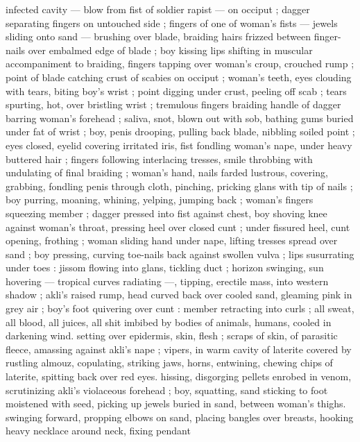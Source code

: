 {infected cavity --- blow from fist of soldier rapist --- on occiput ; 
dagger separating fingers on untouched side ; fingers of one of 
woman's fists --- jewels sliding onto sand --- brushing over blade, 
braiding hairs frizzed between finger-nails over embalmed edge of 
blade ; boy kissing lips shifting in muscular accompaniment to 
braiding, fingers tapping over woman's croup, crouched rump ; point 
of blade catching crust of scabies on occiput ; woman's teeth, eyes 
clouding with tears, biting boy's wrist ; point digging under crust, 
peeling off scab ; tears spurting, hot, over bristling wrist ; tremulous 
fingers braiding handle of dagger barring woman's forehead ; saliva, 
snot, blown out with sob, bathing gums buried under fat of wrist ; 
boy, penis drooping, pulling back blade, nibbling soiled point ; eyes 
closed, eyelid covering irritated iris, fist fondling woman's nape, 
under heavy buttered hair ; fingers following interlacing tresses, 
smile throbbing with undulating of final braiding ; woman's hand, 
nails farded lustrous, covering, grabbing, fondling penis through 
cloth, pinching, pricking glans with tip of nails ; boy purring, 
moaning, whining, yelping, jumping back ; woman's fingers 
squeezing member ; dagger pressed into fist against chest, boy 
shoving knee against woman's throat, pressing heel over closed cunt 
; under fissured heel, cunt opening, frothing ; woman sliding hand 
under nape, lifting tresses spread over sand ; boy pressing, curving 
toe-nails back against swollen vulva ; lips susurrating under toes : 
jissom flowing into glans, tickling duct ; horizon swinging, sun 
hovering --- tropical curves radiating ---, tipping, erectile mass, into 
western shadow ; akli's raised rump, head curved back over cooled 
sand, gleaming pink in grey air ; boy's foot quivering over cunt : 
member retracting into curls ; all sweat, all blood, all juices, all shit 
imbibed by bodies of animals, humans, cooled in darkening wind. 
setting over epidermis, skin, flesh ; scraps of skin, of parasitic 
fleece, amassing against akli's nape ; vipers, in warm cavity of 
laterite covered by rustling almouz, copulating, striking jaws, horns, 
entwining, chewing chips of laterite, spitting back over red eyes. 
hissing, disgorging pellets enrobed in venom, scrutinizing akli's 
violaceous forehead ; boy, squatting, sand sticking to foot moistened 
with seed, picking up jewels buried in sand, between woman's thighs. 
swinging forward, propping elbows on sand, placing bangles over 
breasts, hooking heavy necklace around neck, fixing pendant 
}
